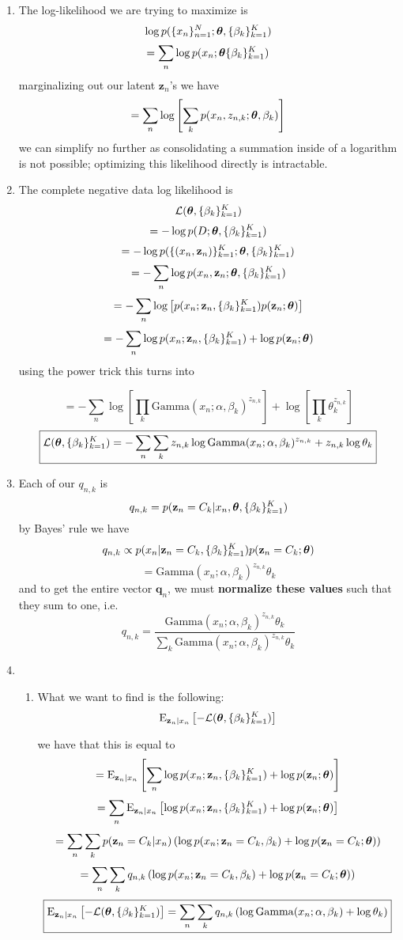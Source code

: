 \documentclass[submit]{harvardml}
\begin{document}
\begin{enumerate}
  \item
  The log-likelihood we are trying to maximize is
  $$\log p(\{x_n\}^N_{n=1}; \boldsymbol{\theta}, \{\beta_k\}^K_{k = 1})$$
  $$=\sum_n\log p(x_n;\boldsymbol{\theta} \{\beta_k\}^K_{k = 1})$$
  marginalizing out our latent $\mathbf{z}_n$'s we have
  $$=\sum_n\log \left[ \sum_k p(x_n,z_{n,k};\boldsymbol{\theta},\beta_k) \right]$$
 we can simplify no further as consolidating a summation inside of a logarithm is not possible; optimizing this likelihood directly is intractable.
  
  \item 
  The complete negative data log likelihood is 
  $$\mathcal{L}(\boldsymbol{\theta},\{\beta_k\}^K_{k=1})$$
  $$=-\log p(D; \boldsymbol{\theta},\{\beta_k\}^K_{k=1})$$
  $$=-\log p(\{(x_n, \mathbf{z}_n)\}^K_{k=1};\boldsymbol{\theta},\{\beta_k\}^K_{k=1})$$
  $$=-\sum_n \log p(x_n, \mathbf{z}_n; \boldsymbol{\theta}, \{\beta_k\}^K_{k=1})$$
  $$=-\sum_n \log\left[p(x_n;\mathbf{z}_n, \{\beta_k\}^K_{k=1})p(\mathbf{z}_n;\boldsymbol{\theta})\right]$$
  $$=-\sum_n \log p(x_n;\mathbf{z}_n, \{\beta_k\}^K_{k=1}) +\log p(\mathbf{z}_n;\boldsymbol{\theta})$$
  using the power trick this turns into
  
  $$=-\sum_n \log\left[\prod_k\mathrm{Gamma}(x_n;\alpha,\beta_k)^{z_{n,k}}\right]+\log\left[\prod_k \theta_k^{z_{n,k}}\right]$$
  $$\boxed{\mathcal{L}(\boldsymbol{\theta},\{\beta_k\}^K_{k=1})=-\sum_n \sum_k z_{n,k}\log\mathrm{Gamma}(x_n;\alpha,\beta_k)^{z_{n,k}}+z_{n,k}\log\theta_k}$$


  \item 
  Each of our $q_{n,k}$ is
  $$q_{n,k}=p(\mathbf{z}_n=C_k|x_n,\boldsymbol{\theta},\{\beta_k\}^K_{k=1})$$
  by Bayes' rule we have
  $$q_{n,k}\propto p(x_n|\mathbf{z}_n=C_k,\{\beta_k\}^K_{k=1})p(\mathbf{z}_n=C_k;\boldsymbol{\theta})$$
  $$= \mathrm{Gamma}(x_n;\alpha,\beta_k)^{z_{n,k}}\theta_k$$
  and to get the entire vector $\mathbf{q}_n$, we must \textbf{normalize these values} such that they sum to one, i.e.
  $$\boxed{q_{n,k}=\frac{\mathrm{Gamma}(x_n;\alpha,\beta_k)^{z_{n,k}}\theta_k}{\sum_k \mathrm{Gamma}(x_n;\alpha,\beta_k)^{z_{n,k}}\theta_k}}$$
  
  \item 
    \begin{enumerate}
      \item 
      What we want to find is the following:
      $$\mathrm{E}_{\mathbf{z}_n|x_n}\left[-\mathcal{L}(\boldsymbol{\theta},\{\beta_k\}^K_{k=1})\right]$$
      
      we have that this is equal to
      $$=\mathrm{E}_{\mathbf{z}_n|x_n}\left[\sum_n\log p(x_n;\mathbf{z}_n,\{\beta_k\}^K_{k=1})+\log p(\mathbf{z}_n;\boldsymbol{\theta})\right]$$
      $$=\sum_n\mathrm{E}_{\mathbf{z}_n|x_n}\left[\log p(x_n;\mathbf{z}_n,\{\beta_k\}^K_{k=1})+\log p(\mathbf{z}_n;\boldsymbol{\theta})\right]$$
      $$=\sum_n\sum_k p(\mathbf{z}_n=C_k|x_n)\left(\log p(x_n;\mathbf{z}_n=C_k,\beta_k)+\log p(\mathbf{z}_n=C_k;\boldsymbol{\theta})\right)$$
      $$=\sum_n\sum_k q_{n,k}\left(\log p(x_n;\mathbf{z}_n=C_k,\beta_k)+\log p(\mathbf{z}_n=C_k;\boldsymbol{\theta})\right)$$
      $$\boxed{\mathrm{E}_{\mathbf{z}_n|x_n}\left[-\mathcal{L}(\boldsymbol{\theta},\{\beta_k\}^K_{k=1})\right]=\sum_n\sum_k q_{n,k}\left(\log\mathrm{Gamma}(x_n;\alpha,\beta_k)+\log \theta_k\right)}$$
      

\end{enumerate}
\end{enumerate}
\end{document}
